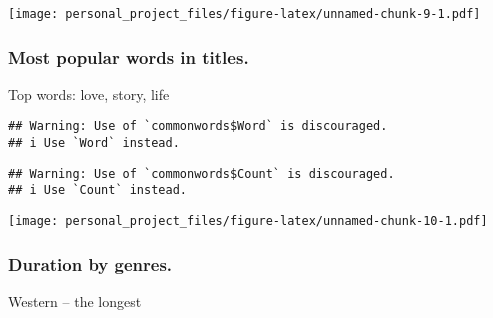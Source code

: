 \documentclass[
]{article}
\newenvironment{Shaded}{\begin{snugshade}}{\end{snugshade}}
\newcommand{\AttributeTok}[1]{\textcolor[rgb]{0.77,0.63,0.00}{#1}}
\newcommand{\FunctionTok}[1]{\textcolor[rgb]{0.00,0.00,0.00}{#1}}
\newcommand{\NormalTok}[1]{#1}
\newcommand{\OtherTok}[1]{\textcolor[rgb]{0.56,0.35,0.01}{#1}}
\newcommand{\SpecialCharTok}[1]{\textcolor[rgb]{0.00,0.00,0.00}{#1}}
\newcommand{\StringTok}[1]{\textcolor[rgb]{0.31,0.60,0.02}{#1}}
\begin{document}
\texttt{[image: personal\_project\_files/figure-latex/unnamed-chunk-9-1.pdf]}

\hypertarget{most-popular-words-in-titles.}{%
\subsubsection{Most popular words in
titles.}\label{most-popular-words-in-titles.}}

Top words: love, story, life

\begin{Shaded}
\end{Shaded}

\begin{verbatim}
## Warning: Use of `commonwords$Word` is discouraged.
## i Use `Word` instead.
\end{verbatim}

\begin{verbatim}
## Warning: Use of `commonwords$Count` is discouraged.
## i Use `Count` instead.
\end{verbatim}

\texttt{[image: personal\_project\_files/figure-latex/unnamed-chunk-10-1.pdf]}

\hypertarget{duration-by-genres.}{%
\subsubsection{Duration by genres.}\label{duration-by-genres.}}

Western -- the longest
\end{document}
